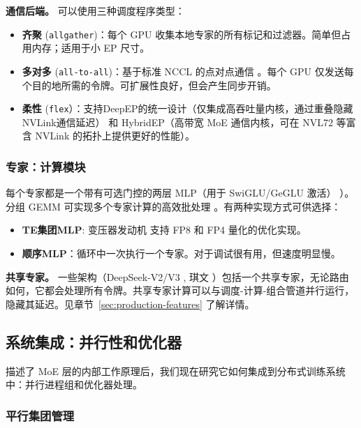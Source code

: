 \textbf{通信后端。} 可以使用三种调度程序类型：
\begin{itemize}
    \item \textbf{齐聚} (\texttt{allgather})：每个 GPU 收集本地专家的所有标记和过滤器。简单但占用内存；适用于小 EP 尺寸。
    \item \textbf{多对多} (\texttt{all-to-all})：基于标准 NCCL 的点对点通信 \cite{lepikhin2020gshard}。每个 GPU 仅发送每个目的地所需的令牌。可扩展性良好，但会产生同步开销。
    \item \textbf{柔性} (\texttt{flex}）：支持DeepEP的统一设计（仅集成高吞吐量内核，通过重叠隐藏NVLink通信延迟） \cite{deepep2025} 和 HybridEP（高带宽 MoE 通信内核，可在 NVL72 等富含 NVLink 的拓扑上提供更好的性能）。
\end{itemize}

\subsubsection{专家：计算模块}

每个专家都是一个带有可选门控的两层 MLP（用于 SwiGLU/GeGLU 激活） \cite{shazeer2020glu}）。分组 GEMM 可实现多个专家计算的高效批处理 \cite{megablocks,hwang2023tutel}。有两种实现方式可供选择：

\begin{itemize}
    \item \textbf{TE集团MLP}: 变压器发动机 \cite{nvidia_transformer_engine} 支持 FP8 和 FP4 量化的优化实现。
    \item \textbf{顺序MLP}：循环中一次执行一个专家。对于调试很有用，但速度明显慢。
\end{itemize}

\textbf{共享专家。} 一些架构（DeepSeek-V2/V3 \cite{deepseekai2024deepseekv2strongeconomicalefficient,deepseekai2025deepseekv3technicalreport}, 琪文 \cite{qwen2025qwen25technicalreport}）包括一个共享专家，无论路由如何，它都会处理所有令牌。共享专家计算可以与调度-计算-组合管道并行运行，隐藏其延迟。见章节~\ref{sec:production-features} 了解详情。


\subsection{系统集成：并行性和优化器}\label{sec:moe-system-integration}

描述了 MoE 层的内部工作原理后，我们现在研究它如何集成到分布式训练系统中：并行进程组和优化器处理。

\subsubsection{平行集团管理}


